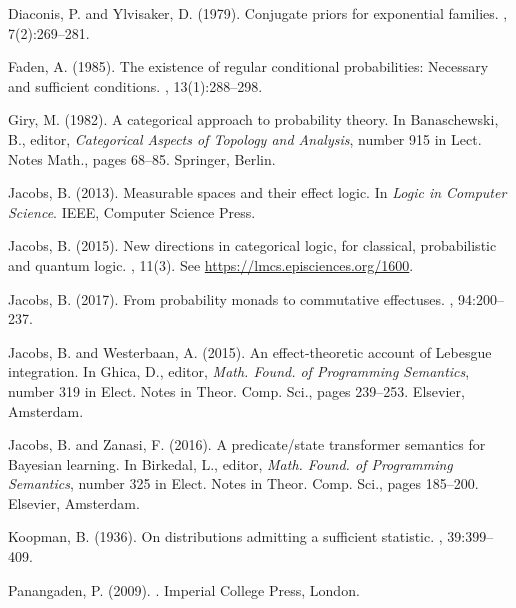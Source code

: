 \documentclass{mscs}
\begin{document}
\begin{thebibliography}{}
Diaconis, P. and Ylvisaker, D. (1979).
\newblock Conjugate priors for exponential families.
, 7(2):269--281.

Faden, A. (1985).
\newblock The existence of regular conditional probabilities: Necessary and
  sufficient conditions.
, 13(1):288--298.

Giry, M. (1982).
\newblock A categorical approach to probability theory.
\newblock In Banaschewski, B., editor, {\em Categorical Aspects of Topology and
  Analysis}, number 915 in Lect. Notes Math., pages 68--85. Springer, Berlin.

Jacobs, B. (2013).
\newblock Measurable spaces and their effect logic.
\newblock In {\em Logic in Computer Science}. IEEE, Computer Science Press.

Jacobs, B. (2015).
\newblock New directions in categorical logic, for classical, probabilistic and
  quantum logic.
, 11(3).
\newblock See \url{https://lmcs.episciences.org/1600}.

Jacobs, B. (2017).
\newblock From probability monads to commutative effectuses.
,
  94:200--237.

Jacobs, B. and Westerbaan, A. (2015).
\newblock An effect-theoretic account of {Lebesgue} integration.
\newblock In Ghica, D., editor, {\em Math. Found. of Programming Semantics},
  number 319 in Elect. Notes in Theor. Comp. Sci., pages 239--253. Elsevier,
  Amsterdam.

Jacobs, B. and Zanasi, F. (2016).
\newblock A predicate/state transformer semantics for {Bayesian} learning.
\newblock In Birkedal, L., editor, {\em Math. Found. of Programming Semantics},
  number 325 in Elect. Notes in Theor. Comp. Sci., pages 185--200. Elsevier,
  Amsterdam.

Koopman, B. (1936).
\newblock On distributions admitting a sufficient statistic.
, 39:399--409.

Panangaden, P. (2009).
.
\newblock Imperial College Press, London.


\end{thebibliography}
\end{document}
